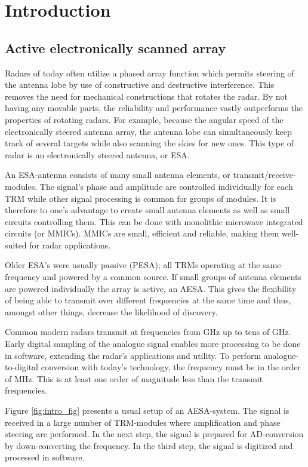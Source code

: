 \chapter{Introduction}
	\section{Active electronically scanned array}
		Radars of today often utilize a phased array function which permits steering of the antenna lobe by use of constructive and destructive interference. This removes the need for mechanical constructions that rotates the radar. By not having any movable parts, the reliability and performance vastly outperforms the properties of rotating radars. For example, because the angular speed of the electronically steered antenna array, the antenna lobe can simultaneously keep track of several targets while also scanning the skies for new ones. This type of radar is an electronically steered antenna, or ESA.\autocite{web:navair02}

		An ESA-antenna consists of many small antenna elements, or transmit/receive-modules. The signal's phase and amplitude are controlled individually for each TRM while other signal processing is common for groups of modules. It is therefore to one's advantage to create small antenna elements as well as small circuits controlling them. This can be done with monolithic microwave integrated circuits (or MMICs). MMICs are small, efficient and reliable, making them well-suited for radar applications.\autocite{stimson98}

		Older ESA's were usually passive (PESA); all TRMs operating at the same frequency and powered by a common source. If small groups of antenna elements are powered individually the array is active, an AESA. This gives the flexibility of being able to transmit over different frequencies at the same time and thus, amongst other things, decrease the likelihood of discovery.\autocites{oliner72}

		Common modern radars transmit at frequencies from \unit[1]{GHz} up to tens of GHz. Early digital sampling of the analogue signal enables more processing to be done in software, extending the radar's applications and utility. To perform analogue-to-digital conversion with today's technology, the frequency must be in the order of \unit[100]{MHz}. This is at least one order of magnitude less than the transmit frequencies. 
		
		Figure \ref{fig:intro_fig} presents a usual setup of an AESA-system. The signal is received in a large number of TRM-modules where amplification and phase steering are performed. In the next step, the signal is prepared for AD-conversion by down-converting the frequency. In the third step, the signal is digitized and processed in software. 
		
